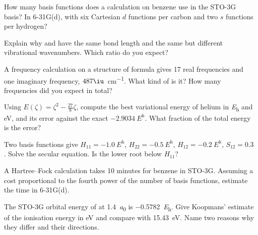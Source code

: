 \begin{exercise}[$\star$]\label{exo:b3:computational-chemistry:2}
How many basis functions does a calculation on benzene use in the STO-3G
basis? In 6-31G(d), with six Cartesian $d$ functions per carbon and two $s$
functions per hydrogen?
\end{exercise}

\begin{exercise}[$\star$]\label{exo:b3:computational-chemistry:3}
Explain why  and  have the same bond length and the same  but different vibrational wavenumbers. Which ratio do you expect?
\end{exercise}

\begin{exercise}[$\star$]\label{exo:b3:computational-chemistry:4}
A frequency calculation on a structure of formula  gives 17 real
frequencies and one imaginary frequency, $487\iu$~\unit{cm^{-1}}. What kind of
 is it? How many frequencies did you expect in total?
\end{exercise}

\begin{exercise}[$\star\star$]\label{exo:b3:computational-chemistry:5}
Using $E(\zeta) = \zeta^2 - \frac{27}{8}\zeta$, compute the best variational
energy of helium in \unit{\hartree} and eV, and its error against the exact
$\qty{-2.9034}{\hartree}$. What fraction of the total energy is the error?
\end{exercise}

\begin{exercise}[$\star\star$]\label{exo:b3:computational-chemistry:6}
Two basis functions give $H_{11} = \qty{-1.0}{\hartree}$, $H_{22} =
\qty{-0.5}{\hartree}$, $H_{12} = \qty{-0.2}{\hartree}$, $S_{12} = 0.3$. Solve the
secular equation. Is the lower root below $H_{11}$?
\end{exercise}

\begin{exercise}[$\star\star$]\label{exo:b3:computational-chemistry:7}
A Hartree--Fock calculation takes 10 minutes for benzene in STO-3G. Assuming
a cost proportional to the fourth power of the number of basis functions,
estimate the time in 6-31G(d).
\end{exercise}

\begin{exercise}[$\star\star$]\label{exo:b3:computational-chemistry:8}
The STO-3G orbital energy of  at \qty{1.4}{\bohr} is
\qty{-0.5782}{\hartree}. Give Koopmans' estimate of the ionisation energy in eV
and compare with \qty{15.43}{eV}. Name two reasons why they differ and their
directions.
\end{exercise}

